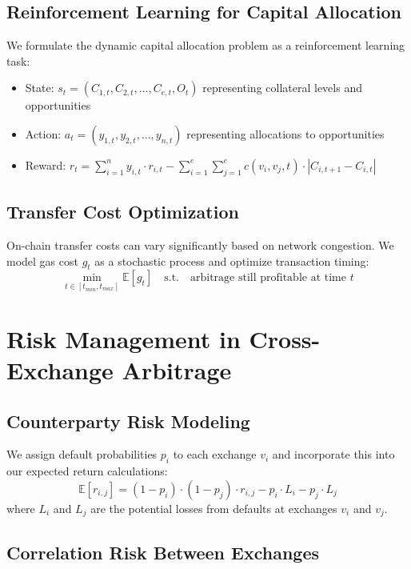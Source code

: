 \documentclass{article}
\begin{document}
\subsection{Reinforcement Learning for Capital Allocation}

We formulate the dynamic capital allocation problem as a reinforcement learning task:
\begin{itemize}
    \item State: $s_t = (C_{1,t}, C_{2,t}, \ldots, C_{e,t}, O_t)$ representing collateral levels and opportunities
    \item Action: $a_t = (y_{1,t}, y_{2,t}, \ldots, y_{n,t})$ representing allocations to opportunities
    \item Reward: $r_t = \sum_{i=1}^n y_{i,t} \cdot r_{i,t} - \sum_{i=1}^e \sum_{j=1}^e c(v_i, v_j, t) \cdot |C_{i,t+1} - C_{i,t}|$
\end{itemize}

\subsection{Transfer Cost Optimization}

On-chain transfer costs can vary significantly based on network congestion. We model gas cost $g_t$ as a stochastic process and optimize transaction timing:
\begin{equation}
\min_{t \in [t_{min}, t_{max}]} \mathbb{E}[g_t] \quad \text{s.t.} \quad \text{arbitrage still profitable at time $t$}
\end{equation}

\section{Risk Management in Cross-Exchange Arbitrage}

\subsection{Counterparty Risk Modeling}

We assign default probabilities $p_i$ to each exchange $v_i$ and incorporate this into our expected return calculations:
\begin{equation}
\mathbb{E}[r_{i,j}] = (1 - p_i) \cdot (1 - p_j) \cdot r_{i,j} - p_i \cdot L_i - p_j \cdot L_j
\end{equation}
where $L_i$ and $L_j$ are the potential losses from defaults at exchanges $v_i$ and $v_j$.

\subsection{Correlation Risk Between Exchanges}
\end{document}
